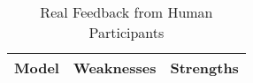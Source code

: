 
\begin{table*}[h]
\centering
\vspace{-13pt}
\begin{tabularx}{\textwidth}{|c|X|X|}
    \hline
    \footnotesize \textbf{Model} & \footnotesize \textbf{Weaknesses} & \footnotesize \textbf{Strengths} \\
    \hline
\end{tabularx}
\vspace{-6pt}
\caption{Real Feedback from Human Participants}
\label{tab:user_study}
\end{table*}
